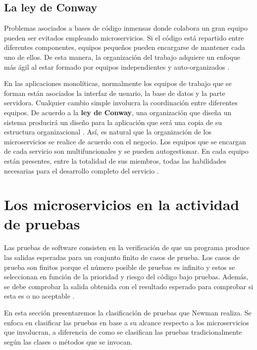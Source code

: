\documentclass[11pt,spanish,listoffigures]{tfgetsinf}
\begin{document}
\subsection{La ley de Conway \cite{Conway1968}}

Problemas asociados a bases de código inmensas donde colabora un gran equipo pueden ser evitados empleando microservicios. Si el código está repartido entre diferentes componentes, equipos pequeños pueden encargarse de mantener cada uno de ellos. De esta manera, la organización del trabajo adquiere un enfoque más ágil al estar formado por equipos independientes y auto-organizados \cite{Newman2015a}.

En las aplicaciones monolíticas, normalmente los equipos de trabajo que se forman están asociados la interfaz de usuario, la base de datos y la parte servidora. Cualquier cambio simple involucra la coordinación entre diferentes equipos. De acuerdo a la \textbf{ley de Conway}, una organización que diseña un sistema producirá un diseño para la aplicación que será una copia de su estructura organizacional \cite{Conway1968}. Así, es natural que la organización de los microservicios se realice de acuerdo con el negocio. Los equipos que se encargan de cada servicio son multifuncionales y se pueden autogestionar. En cada equipo están presentes, entre la totalidad de sus miembros, todas las habilidades necesarias para el desarrollo completo del servicio \cite{Lewis2014}.

\section{Los microservicios en la actividad de pruebas} \label{sect:FasePruebas}

Las pruebas de software consisten en la verificación de que un programa produce las salidas esperadas para un conjunto finito de casos de prueba. Los casos de prueba son finitos porque el número posible de pruebas es infinito y estos se seleccionan en función de la prioridad y riesgo del código bajo pruebas. Además, se debe comprobar la salida obtenida con el resultado esperado para comprobar si esta es o no aceptable \cite{Bourque2014}.

En esta sección presentaremos la clasificación de pruebas que Newman \cite{Newman2015a} realiza. Se enfoca en clasificar las pruebas en base a su alcance respecto a los microservicios que involucran, a diferencia de como se clasifican las pruebas tradicionalmente según las clases o métodos que se invocan.
\end{document}

